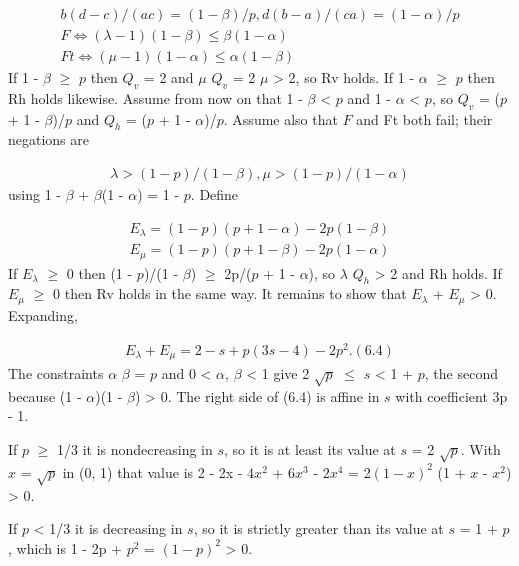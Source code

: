 \documentclass[11pt]{article}
\begin{document}
\begin{gather*}
b(d - c)/(ac) = (1 - \beta)/p,   d(b - a)/(ca) = (1 - \alpha)/p \\
F  \Longleftrightarrow (\lambda - 1)(1 - \beta) \le  \beta (1 - \alpha) \\
Ft \Longleftrightarrow (\mu - 1)(1 - \alpha) \le  \alpha (1 - \beta)
\end{gather*}
If 1 - \(\beta\) \(\ge\) \(p\) then \(Q_{v}\) = 2 and \(\mu\) \(Q_{v}\) = 2 \(\mu\) > 2, so Rv holds. If 1 - \(\alpha\) \(\ge\) \(p\) then Rh holds likewise. Assume from now on that 1 - \(\beta\) < \(p\) and 1 - \(\alpha\) < \(p\), so \(Q_{v}\) = (\(p\) + 1 - \(\beta\))/\(p\) and \(Q_{h}\) = (\(p\) + 1 - \(\alpha\))/\(p\). Assume also that \(F\) and Ft both fail; their negations are

\begin{gather*}
\lambda > (1 - p)/(1 - \beta),   \mu > (1 - p)/(1 - \alpha)
\end{gather*}
using 1 - \(\beta\) + \(\beta\)(1 - \(\alpha\)) = 1 - \(p\). Define

\begin{gather*}
E_{\lambda} = (1 - p)(p + 1 - \alpha) - 2p(1 - \beta) \\
E_{\mu}     = (1 - p)(p + 1 - \beta) - 2p(1 - \alpha)
\end{gather*}
If \(E_{\lambda}\) \(\ge\) 0 then (1 - \(p\))/(1 - \(\beta\)) \(\ge\) 2p/(\(p\) + 1 - \(\alpha\)), so \(\lambda\) \(Q_{h}\) > 2 and Rh holds. If \(E_{\mu}\) \(\ge\) 0 then Rv holds in the same way. It remains to show that \(E_{\lambda}\) + \(E_{\mu}\) > 0. Expanding,

\begin{gather*}
E_{\lambda} + E_{\mu} = 2 - s + p(3s - 4) - 2p^{2}.                       (6.4)
\end{gather*}
The constraints \(\alpha\) \(\beta\) = \(p\) and 0 < \(\alpha\), \(\beta\) < 1 give 2 \(\sqrt{p}\) \(\le\) \(s\) < 1 + \(p\), the second because (1 - \(\alpha\))(1 - \(\beta\)) > 0. The right side of (6.4) is affine in \(s\) with coefficient 3p - 1.

If \(p\) \(\ge\) 1/3 it is nondecreasing in \(s\), so it is at least its value at \(s\) = 2 \(\sqrt{p}\). With \(x\) = \(\sqrt{p}\) in (0, 1) that value is 2 - 2x - \(4x^{2}\) + \(6x^{3}\) - \(2x^{4}\) = 2\((1 - x)^2\) (1 + \(x\) - \(x^{2}\)) > 0.

If \(p\) < 1/3 it is decreasing in \(s\), so it is strictly greater than its value at \(s\) = 1 + \(p\), which is 1 - 2p + \(p^{2}\) = \((1 - p)^2\) > 0.
\end{document}
